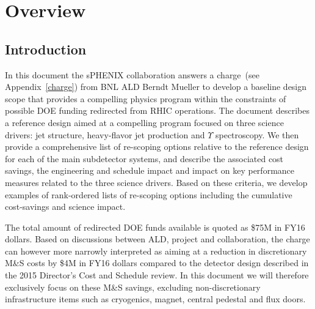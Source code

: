 \chapter{Overview}
\label{configurations}
\setcounter{page}{1}

\section{Introduction}
In this document the sPHENIX collaboration answers a charge~(see
Appendix~\ref{charge}) from BNL ALD Berndt Mueller to develop
a baseline design scope that provides a compelling physics program
within the constraints of possible DOE funding redirected from 
RHIC operations. The document describes a reference design aimed
at a compelling program focused on three science drivers: jet structure,
heavy-flavor jet production and $\Upsilon$ spectroscopy. We then
provide a comprehensive list of re-scoping options relative 
to the reference design for each
of the main subdetector systems, and describe the associated
cost savings, the engineering and schedule impact and impact on 
key performance measures related to the three science 
drivers. Based on these criteria, we develop examples of 
rank-ordered lists of re-scoping options including the 
cumulative cost-savings and science impact.

The total amount of redirected DOE funds available is quoted as \$75M in FY16 dollars.
Based on discussions between ALD, project and collaboration, the charge can
however more narrowly interpreted as aiming at a reduction in discretionary M\&S costs 
by \$4M in FY16 dollars compared to the detector design described
in the 2015 Director's Cost and Schedule review. In this document we will
therefore exclusively focus on these M\&S savings, excluding non-discretionary 
infrastructure items such as cryogenics, magnet, central pedestal and flux doors.

